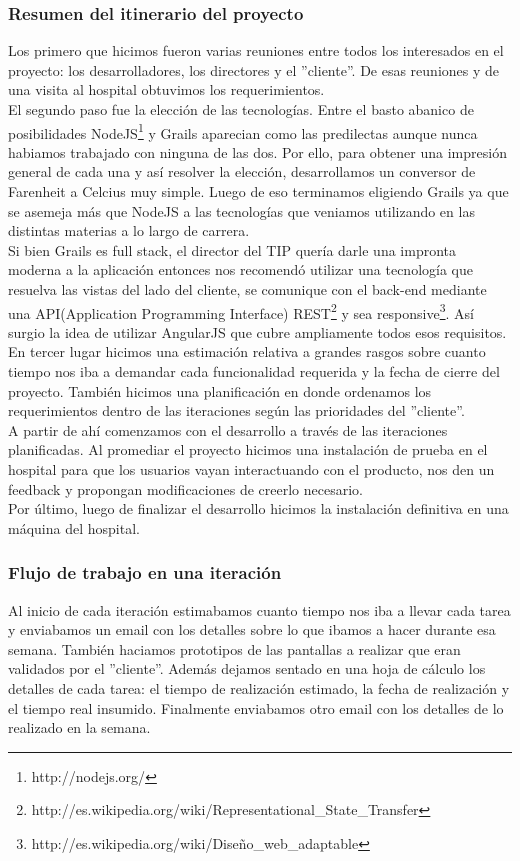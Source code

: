 \subsubsection{Resumen del itinerario del proyecto}
Los primero que hicimos fueron varias reuniones entre todos los interesados en el proyecto: los desarrolladores, los directores y el ''cliente''. De esas reuniones y de una visita al hospital obtuvimos los requerimientos.\\
El segundo paso fue la elección de las tecnologías. Entre el basto abanico de posibilidades NodeJS\footnote{http://nodejs.org/} y Grails aparecian como las predilectas aunque nunca habiamos trabajado con ninguna de las dos. Por ello, para obtener una impresión general de cada una y así resolver la elección, desarrollamos un conversor de Farenheit a Celcius muy simple. Luego de eso terminamos eligiendo Grails ya que se asemeja más que NodeJS a las tecnologías que veniamos utilizando en las distintas materias a lo largo de carrera.\\
Si bien Grails es full stack, el director del TIP quería darle una impronta moderna a la aplicación entonces nos recomendó utilizar una tecnología que resuelva las vistas del lado del cliente, se comunique con el back-end mediante una API(Application Programming Interface) REST\footnote{http://es.wikipedia.org/wiki/Representational\_State\_Transfer} 
y sea responsive\footnote{http://es.wikipedia.org/wiki/Diseño\_web\_adaptable}. Así surgio la idea de utilizar AngularJS que cubre ampliamente todos esos requisitos.\\
En tercer lugar hicimos una estimación relativa a grandes rasgos sobre cuanto tiempo nos iba a demandar cada funcionalidad requerida y la fecha de cierre del proyecto. También hicimos una planificación en donde ordenamos los requerimientos dentro de las iteraciones según las prioridades del ''cliente''.\\
A partir de ahí comenzamos con el desarrollo a través de las iteraciones planificadas. Al promediar el proyecto hicimos una instalación de prueba en el hospital para que los usuarios vayan interactuando con el producto, nos den un feedback y propongan modificaciones de creerlo necesario.\\
Por último, luego de finalizar el desarrollo hicimos la instalación definitiva en una máquina del hospital.
\subsubsection{Flujo de trabajo en una iteración}
Al inicio de cada iteración estimabamos cuanto tiempo nos iba a llevar cada tarea y enviabamos un email con los detalles sobre lo que ibamos a hacer durante esa semana. También haciamos prototipos de las pantallas a realizar que eran validados por el ''cliente''. Además dejamos sentado en una hoja de cálculo los detalles de cada tarea: el tiempo de realización estimado, la fecha de realización y el tiempo real insumido. Finalmente enviabamos otro email con los detalles de lo realizado en la semana.
